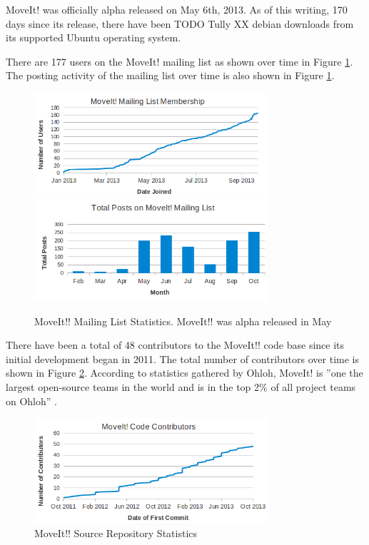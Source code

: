 \documentclass[10pt,journal,compsoc]{joser1}
\begin{document}
{MoveIt! was officially alpha released on May 6th, 2013. As of this writing, 170 days since its release, there have been TODO Tully XX debian downloads from its supported Ubuntu operating system.

There are 177 users on the MoveIt! mailing list as shown over time in Figure \ref{fig:membership_plot}. The posting activity of the mailing list over time is also shown in Figure \ref{fig:membership_plot}.

\begin{figure}[!t]
\centering
\includegraphics[width=3.4in]{images/membership_plot}
\includegraphics[width=3.4in]{images/mailing_list}
\caption{MoveIt!! Mailing List Statistics. MoveIt!! was alpha released in May}
\label{fig:membership_plot}
\end{figure}

There have been a total of 48 contributors to the MoveIt!! code base since its initial development began in 2011. The total number of contributors over time is shown in Figure \ref{fig:contributors}. According to statistics gathered by Ohloh, MoveIt! is ''one the largest open-source teams in the world and is in the top 2\% of all project teams on Ohloh'' \cite{ohloh}.

\begin{figure}[!t]
\centering
\includegraphics[width=3.4in]{images/moveit_contributors}
\caption{MoveIt!! Source Repository Statistics}
\label{fig:contributors}
\end{figure}

}
\end{document}
